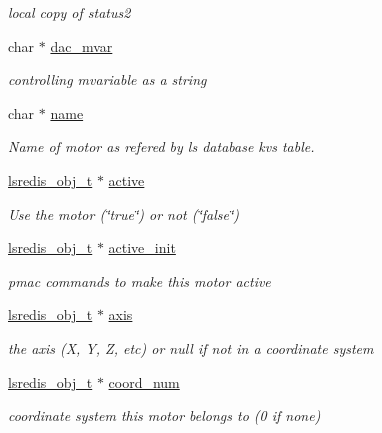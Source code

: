 \begin{DoxyCompactItemize}
\begin{DoxyCompactList}\small\item\em local copy of status2 \end{DoxyCompactList}\item 
char $\ast$ \hyperlink{structlspmac__motor__struct_a05dff021221abbc1bf656039fffb3275}{dac\-\_\-mvar}
\begin{DoxyCompactList}\small\item\em controlling mvariable as a string \end{DoxyCompactList}\item 
char $\ast$ \hyperlink{structlspmac__motor__struct_aa90af2f6f1489f1befe1d0891e51575a}{name}
\begin{DoxyCompactList}\small\item\em Name of motor as refered by ls database kvs table. \end{DoxyCompactList}\item 
\hyperlink{pgpmac_8h_ad449de06d02791adf2498d2a1e1f909c}{lsredis\-\_\-obj\-\_\-t} $\ast$ \hyperlink{structlspmac__motor__struct_aed4998885bcd5a2a30069637180f58e3}{active}
\begin{DoxyCompactList}\small\item\em Use the motor (\char`\"{}true\char`\"{}) or not (\char`\"{}false\char`\"{}) \end{DoxyCompactList}\item 
\hyperlink{pgpmac_8h_ad449de06d02791adf2498d2a1e1f909c}{lsredis\-\_\-obj\-\_\-t} $\ast$ \hyperlink{structlspmac__motor__struct_ac2a02f137e4a35db816bc728290d3558}{active\-\_\-init}
\begin{DoxyCompactList}\small\item\em pmac commands to make this motor active \end{DoxyCompactList}\item 
\hyperlink{pgpmac_8h_ad449de06d02791adf2498d2a1e1f909c}{lsredis\-\_\-obj\-\_\-t} $\ast$ \hyperlink{structlspmac__motor__struct_a7437ef16c2dce65bde4dda1ea00e9df3}{axis}
\begin{DoxyCompactList}\small\item\em the axis (X, Y, Z, etc) or null if not in a coordinate system \end{DoxyCompactList}\item 
\hyperlink{pgpmac_8h_ad449de06d02791adf2498d2a1e1f909c}{lsredis\-\_\-obj\-\_\-t} $\ast$ \hyperlink{structlspmac__motor__struct_a5614e003272e8323f8809bf7b6559532}{coord\-\_\-num}
\begin{DoxyCompactList}\small\item\em coordinate system this motor belongs to (0 if none) \end{DoxyCompactList}\item 

\end{DoxyCompactItemize}
